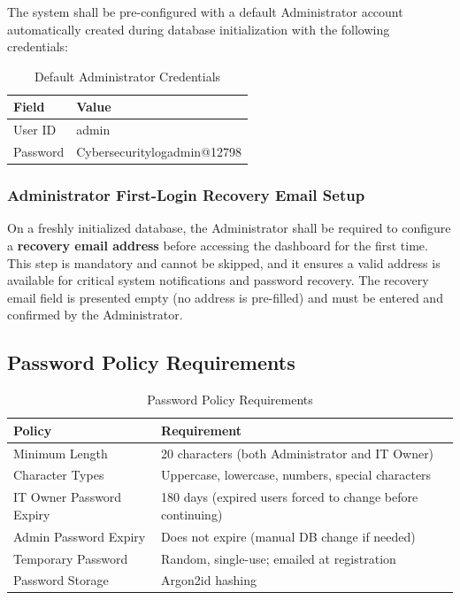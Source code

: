 \documentclass[12pt,a4paper]{article}
\begin{document}
The system shall be pre-configured with a default Administrator account automatically created during database initialization with the following credentials:

\begin{table}[H]
\centering
\begin{tabular}{|l|l|}
\hline
\textbf{Field} & \textbf{Value} \\
\hline
User ID & admin \\
\hline
Password & Cybersecuritylogadmin@12798 \\
\hline
\end{tabular}
\caption{Default Administrator Credentials}
\label{tab:admin-credentials}
\end{table}

\subsubsection{Administrator First-Login Recovery Email Setup}
On a freshly initialized database, the Administrator shall be required to configure a \textbf{recovery email address} before accessing the dashboard for the first time. This step is mandatory and cannot be skipped, and it ensures a valid address is available for critical system notifications and password recovery. The recovery email field is presented empty (no address is pre-filled) and must be entered and confirmed by the Administrator.

\subsection{Password Policy Requirements}

\begin{table}[H]
\centering
\begin{tabular}{|l|l|}
\hline
\textbf{Policy} & \textbf{Requirement} \\
\hline
Minimum Length & 20 characters (both Administrator and IT Owner) \\
\hline
Character Types & Uppercase, lowercase, numbers, special characters \\
\hline
IT Owner Password Expiry & 180 days (expired users forced to change before continuing) \\
\hline
Admin Password Expiry & Does not expire (manual DB change if needed) \\
\hline
Temporary Password & Random, single-use; emailed at registration \\
\hline
Password Storage & Argon2id hashing \\
\hline
\end{tabular}
\caption{Password Policy Requirements}
\label{tab:password-policy}
\end{table}
\end{document}

